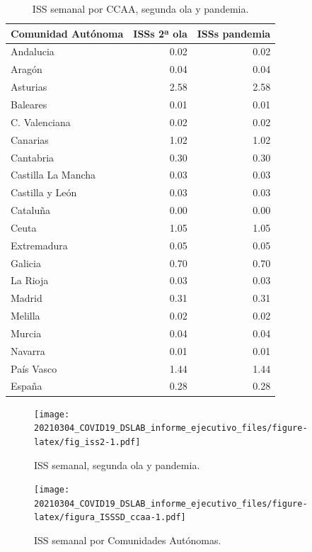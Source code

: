 \documentclass[
  11pt,
]{article}
\begin{document}
\begin{table}[!h]

\caption{\label{tab:tabla2}ISS semanal por CCAA, segunda ola y pandemia.}
\centering
\fontsize{9}{11}\selectfont
\begin{tabular}[t]{l|r|r}
\hline
Comunidad Autónoma & ISSs 2ª ola & ISSs pandemia\\
\hline
Andalucia & 0.02 & 0.02\\
\hline
Aragón & 0.04 & 0.04\\
\hline
Asturias & 2.58 & 2.58\\
\hline
Baleares & 0.01 & 0.01\\
\hline
C. Valenciana & 0.02 & 0.02\\
\hline
Canarias & 1.02 & 1.02\\
\hline
Cantabria & 0.30 & 0.30\\
\hline
Castilla La Mancha & 0.03 & 0.03\\
\hline
Castilla y León & 0.03 & 0.03\\
\hline
Cataluña & 0.00 & 0.00\\
\hline
Ceuta & 1.05 & 1.05\\
\hline
Extremadura & 0.05 & 0.05\\
\hline
Galicia & 0.70 & 0.70\\
\hline
La Rioja & 0.03 & 0.03\\
\hline
Madrid & 0.31 & 0.31\\
\hline
Melilla & 0.02 & 0.02\\
\hline
Murcia & 0.04 & 0.04\\
\hline
Navarra & 0.01 & 0.01\\
\hline
País Vasco & 1.44 & 1.44\\
\hline
España & 0.28 & 0.28\\
\hline
\end{tabular}
\end{table}

\begin{figure}
\centering
\texttt{[image: 20210304\_COVID19\_DSLAB\_informe\_ejecutivo\_files/figure-latex/fig\_iss2-1.pdf]}
\caption{\label{fig:fig_iss2} ISS semanal, segunda ola y pandemia.}
\end{figure}

\begin{figure}
\centering
\texttt{[image: 20210304\_COVID19\_DSLAB\_informe\_ejecutivo\_files/figure-latex/figura\_ISSSD\_ccaa-1.pdf]}
\caption{\label{fig:figura_ISSSD_ccaa} ISS semanal por Comunidades
Autónomas.}
\end{figure}
\end{document}
